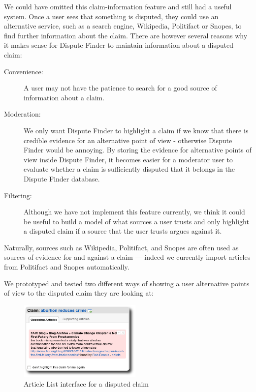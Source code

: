 \documentclass{www2010-submission}
\begin{document}
We could have omitted this claim-information feature and still had a useful system. Once a user sees that something is disputed, they could use an alternative service, such as a search engine, Wikipedia, Politifact or Snopes, to find further information about the claim. There are however several reasons why it makes sense for Dispute Finder to maintain information about a disputed claim:

\begin{description}
\item[Convenience:] A user may not have the patience to search for a good source of information about a claim. 
\item[Moderation:] We only want Dispute Finder to highlight a claim if we know that there is credible evidence for an alternative point of view - otherwise Dispute Finder would be annoying. By storing the evidence for alternative points of view inside Dispute Finder, it becomes easier for a moderator user to evaluate whether a claim is sufficiently disputed that it belongs in the Dispute Finder database.
\item[Filtering:] Although we have not implement this feature currently, we think it could be useful to build a model of what sources a user trusts and only highlight a disputed claim if a source that the user trusts argues against it.
\end{description}

Naturally, sources such as Wikipedia, Politifact, and Snopes are often used as sources of evidence for and against a claim --- indeed we currently import articles from Politifact and Snopes automatically.

We prototyped and tested two different ways of showing a user alternative points of view to the disputed claim they are looking at:

\begin{figure}[tb]
	\begin{center}
	\includegraphics[width=6cm]{pictures/popup_abortion_shadow.png}
	\caption{Article List interface for a disputed claim}
	\label{article_list}
	\end{center}
\end{figure}
\end{document}

